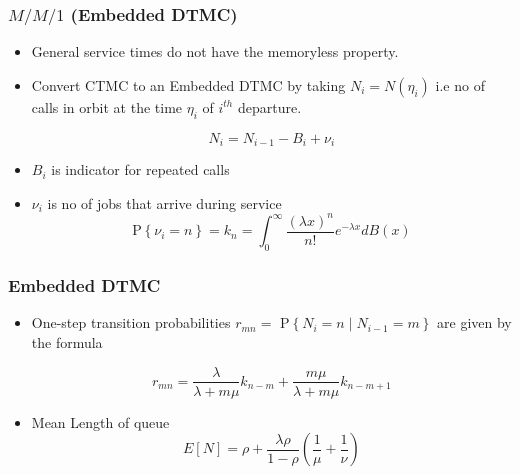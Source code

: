 \documentclass{beamer}
\def \mp {\pause}
\def \mp {}
\newcommand{\ft}[1]{\frametitle{#1}}
\begin{document}
\begin{frame}
 \ft{$M/M/1$ (Embedded DTMC)}
\begin{itemize}\setlength\itemsep{.6em}
\mp\item General service times do not have the memoryless property.
\mp \item Convert CTMC to an Embedded DTMC by taking $N_i=N(\eta_i)$ i.e no of calls in orbit at the time $\eta_i$ of $i^{th}$ departure. 

\begin{equation*}
N_{i}=N_{i-1}-B_{i}+\nu_{i} 
\end{equation*}
\mp \item $B_i$ is indicator for repeated calls
\mp \item $\nu_{i}$ is no of jobs that arrive during service
\begin{equation*}
\mathrm{P}\left\{\nu_{i}=n\right\}=k_n=\int_{0}^{\infty} \frac{(\lambda x)^{n}}{n !} e^{-\lambda x} d B(x) 
\end{equation*}


\end{itemize}
\end{frame}

\begin{frame}
 \ft{Embedded DTMC}
\begin{itemize}
\mp \item One-step transition probabilities $r_{m n}=$ $\mathrm{P}\left\{N_{i}=n \mid N_{i-1}=m\right\}$ are given by the formula


\begin{equation*}
r_{m n}=\frac{\lambda}{\lambda+m \mu} k_{n-m}+\frac{m \mu}{\lambda+m \mu} k_{n-m+1} 
\end{equation*}

\mp \item Mean Length of queue 
\[E[N]=\rho+\frac{\lambda \rho}{1-\rho}\left( \frac{1}{\mu}+\frac{1}{\nu}\right)\]

\end{itemize}
\end{frame}
\end{document}
